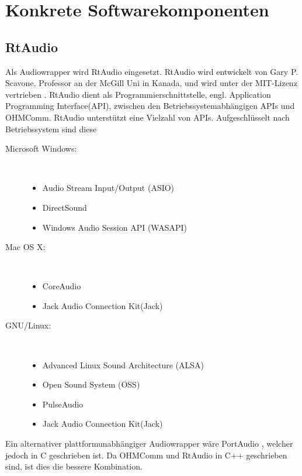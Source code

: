 \FloatBarrier

\section{Konkrete Softwarekomponenten}
\subsection{RtAudio}
\label{sec:RtAudio}
Als Audiowrapper wird RtAudio \cite{RtAudio} eingesetzt. RtAudio wird entwickelt von Gary P. Scavone, Professor an der McGill Uni in Kanada, und wird unter der MIT-Lizenz  vertrieben \cite{RtAudio:License}. RtAudio dient als Programmierschnittstelle, engl. Application Programming Interface(API), zwischen den Betriebssystemabhängigen APIs und OHMComm. RtAudio unterstützt eine Vielzahl von APIs. Aufgeschlüsselt nach Betriebssystem sind diese \cite{RTAudioAPIs}

\begin{description}
\item[Microsoft Windows:]~\par
\begin{itemize}
\item Audio Stream Input/Output (ASIO)
\item DirectSound
\item Windows Audio Session API (WASAPI)
\end{itemize}
\item[Mac OS X:]~\par
\begin{itemize}
\item CoreAudio
\item Jack Audio Connection Kit(Jack)
\end{itemize}
\item[GNU/Linux:]~\par
\begin{itemize}
\item Advanced Linux Sound Architecture (ALSA)
\item Open Sound System (OSS)
\item PulseAudio
\item Jack Audio Connection Kit(Jack)
\end{itemize} 
\end{description}

Ein alternativer plattformunabhängiger Audiowrapper wäre PortAudio \cite{Portaudio}, welcher jedoch in C geschrieben ist. Da OHMComm und RtAudio in C++ geschrieben sind, ist dies die bessere Kombination.

